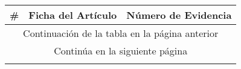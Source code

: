 \setcounter{conteoarticulos}{0}
\begin{longtable}{p{0.5cm}|p{14.0cm}|p{2cm}}
\hline
\textbf{\#} &
\textbf{Ficha del Artículo} & 
\textbf{Número de Evidencia}   \\ 
\hline 
\endfirsthead
\multicolumn{3}{c}{Continuación de la tabla en la página anterior} \\ 
\hline 
\endhead
\multicolumn{3}{c}{Continúa en la siguiente página} \\ 
\endfoot 
\endlastfoot 
\end{longtable}
